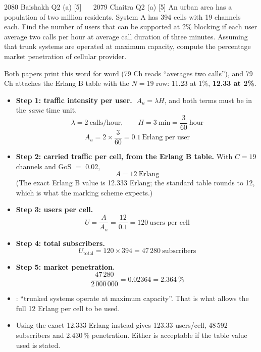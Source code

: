 \hr

{\color{sub}\footnotesize {} }

\begin{asked}{2080 Baishakh \textperiodcentered{} Q2 (a) \textperiodcentered{} [5]
\ \textperiodcentered{} \ 2079 Chaitra \textperiodcentered{} Q2 (a) \textperiodcentered{} [5]}
An urban area has a population of two million residents. System A has 394 cells with 19
channels each. Find the number of users that can be supported at 2\% blocking if each user
average two calls per hour at average call duration of three minutes. Assuming that trunk
systems are operated at maximum capacity, compute the percentage market penetration of
cellular provider.
\par\vspace{1pt}
{\color{sub}Both papers print this word for word (79 Ch reads ``averages two calls''), and
79 Ch attaches the Erlang B table with the $N = 19$ row: 11.23 at 1\%, \textbf{12.33 at 2\%}.}
\end{asked}

\begin{itemize}
  \item \textbf{Step 1: traffic intensity per user.} $\;A_u = \lambda H$, and both terms must be in
        the \emph{same} time unit.
        \[ \lambda = 2\ \text{calls/hour}, \qquad H = 3\ \text{min} = \frac{3}{60}\ \text{hour} \]
        \[ A_u = 2 \times \frac{3}{60} = \boxed{0.1\ \text{Erlang per user}} \]
  \item \textbf{Step 2: carried traffic per cell, from the Erlang B table.}
        With $C = 19$ channels and GoS $=$ 0.02,
        \[ A = 12\ \text{Erlang} \]
        {\color{sub}\footnotesize (The exact Erlang B value is 12.333 Erlang; the standard table
        rounds to 12, which is what the marking scheme expects.)}
  \item \textbf{Step 3: users per cell.}
        \[ U = \frac{A}{A_u} = \frac{12}{0.1} = 120\ \text{users per cell} \]
  \item \textbf{Step 4: total subscribers.}
        \[ U_{\text{total}} = 120 \times 394 = \boxed{47\,280\ \text{subscribers}} \]
  \item \textbf{Step 5: market penetration.}
        \[ \frac{47\,280}{2\,000\,000} = 0.02364 = \boxed{2.364\ \%} \]
  \item {}: ``trunked systems operate at maximum
        capacity''. That is what allows the full 12 Erlang per cell to be used.
  \item {\color{sub}\footnotesize Using the exact 12.333 Erlang instead gives 123.33 users/cell,
        48\,592 subscribers and 2.430\,\% penetration. Either is acceptable if the table value
        used is stated.}
\end{itemize}

